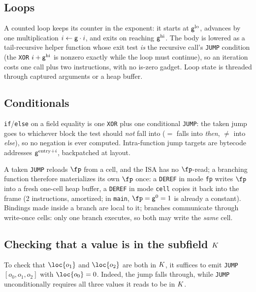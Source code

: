 \subsection{Loops}\label{sec:prog-loops}

A counted loop keeps its counter in the exponent: it starts at $\mathsf{g}^{\mathrm{lo}}$, advances by one multiplication $i\gets\mathsf{g}\cdot i$, and exits on reaching $\mathsf{g}^{\mathrm{hi}}$. The body is lowered as a tail-recursive helper function whose exit test \emph{is} the recursive call's \texttt{JUMP} condition (the \texttt{XOR} $i+\mathsf{g}^{\mathrm{hi}}$ is nonzero exactly while the loop must continue), so an iteration costs one call plus two instructions, with no is-zero gadget. Loop state is threaded through captured arguments or a heap buffer.

\subsection{Conditionals}\label{sec:prog-conditionals}

\texttt{if}/\texttt{else} on a field equality is one \texttt{XOR} plus one conditional \texttt{JUMP}: the taken jump goes to whichever block the test should \emph{not} fall into ($=$ falls into \emph{then}, $\neq$ into \emph{else}), so no negation is ever computed. Intra-function jump targets are bytecode addresses $\mathsf{g}^{\mathrm{entry}+i}$, backpatched at layout.

A taken \texttt{JUMP} reloads $\fp$ from a cell, and the ISA has no $\fp$-read; a branching function therefore materializes its own $\fp$ once: a \texttt{DEREF} in mode \texttt{fp} writes $\fp$ into a fresh one-cell heap buffer, a \texttt{DEREF} in mode \texttt{cell} copies it back into the frame (2 instructions, amortized; in \texttt{main}, $\fp=\gen^{0}=1$ is already a constant). Bindings made inside a branch are local to it; branches communicate through write-once cells: only one branch executes, so both may write the \emph{same} cell.

\subsection{Checking that a value is in the subfield \texorpdfstring{$K$}{K}}\label{sec:prog-subfield-checks}

To check that $\loc{o_1}$ and $\loc{o_2}$ are both in $K$, it suffices to emit \texttt{JUMP} $[o_0,o_1,o_2]$ with $\loc{o_0}=0$. Indeed, the jump falls through, while \texttt{JUMP} unconditionally requires all three values it reads to be in $K$.

